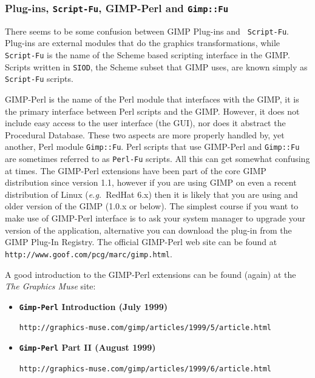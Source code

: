 \documentclass[twoside,11pt]{article}
\newcommand{\htmladdnormallink}[2]{#1}
\newcommand{\latex}[1]{#1}
\begin{document}
\subsubsection{Plug-ins, {\tt Script-Fu}, GIMP-Perl and {\tt Gimp::Fu}}

There seems to be some confusion between GIMP Plug-ins and {\tt
Script-Fu}.  Plug-ins are external modules that do the graphics
transformations, while {\tt Script-Fu} is the name of the Scheme based
scripting interface in the GIMP.  Scripts written in {\tt SIOD}, the
Scheme subset that GIMP uses, are known simply as {\tt Script-Fu}
scripts.

\htmladdnormallink{GIMP-Perl}{http://www.goof.com/pcg/marc/gimp.html}
is the name of the Perl module that interfaces with the GIMP, it is
the primary interface between Perl scripts and the GIMP. However, it
does not include easy access to the user interface (the GUI), nor does
it abstract the Procedural Database. These two aspects are more
properly handled by, yet another, Perl module {\tt Gimp::Fu}. Perl
scripts that use GIMP-Perl and {\tt Gimp::Fu} are sometimes referred
to as {\tt Perl-Fu} scripts. All this can get somewhat confusing at
times. The GIMP-Perl extensions have been part of the core GIMP
distribution since version 1.1, however if you are using GIMP on even
a recent distribution of Linux ({\em e.g.\ }RedHat 6.x) then it is
likely that you are using and older version of the GIMP (1.0.x or
below). The simplest course if you want to make use of GIMP-Perl
interface is to ask your system manager to upgrade your version of the
application, alternative you can download the plug-in from the GIMP
Plug-In Registry. \latex{The official GIMP-Perl web site can be found
at {\tt http://www.goof.com/pcg/marc/gimp.html}.}

A good introduction to the GIMP-Perl extensions can be found (again)
at the \htmladdnormallink{{\em The Graphics
Muse}}{http://graphics-muse.com/} site:

\begin{itemize}
\item {\bf{\tt Gimp-Perl} Introduction (July 1999)}\\
\begin{small}\htmladdnormallink{{\tt http://graphics-muse.com/gimp/articles/1999/5/article.html}}{http://graphics-muse.com/gimp/articles/1999/5/article.html}\end{small}
\item {\bf{\tt Gimp-Perl} Part II (August 1999)}\\
\begin{small}\htmladdnormallink{{\tt http://graphics-muse.com/gimp/articles/1999/6/article.html}}{http://graphics-muse.com/gimp/articles/1999/6/article.html}\end{small}
\end{itemize}
\end{document}
